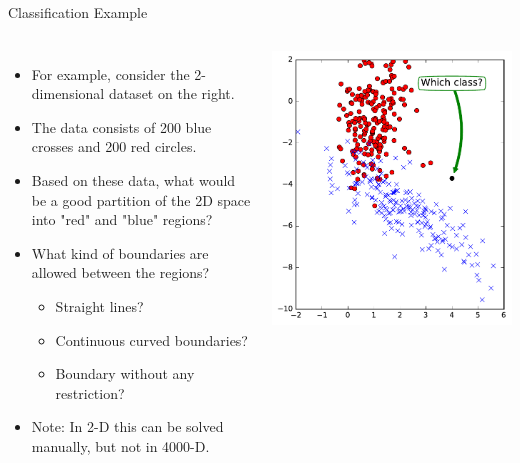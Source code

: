 \documentclass[10pt, aspectratio=169]{beamer} %
\begin{document}
\begin{frame}{Classification Example}
\begin{columns}
\begin{itemize}
\item For example, consider the 2-dimensional dataset on the right.
\item The data consists of 200 blue crosses and 200 red circles.
\item Based on these data, what would be a good partition of the 2D space into
"red" and "blue" regions?
\item What kind of boundaries are allowed between the regions?
\begin{itemize}
\item Straight lines?
\item Continuous curved boundaries?
\item Boundary without any restriction?
\end{itemize}
\item Note: In 2-D this can be solved manually, but not in 4000-D.
\end{itemize}
\centerline{\includegraphics[width=1.2\columnwidth]{twoClassExample.pdf}}
\end{columns}
\end{frame}
\end{document}
